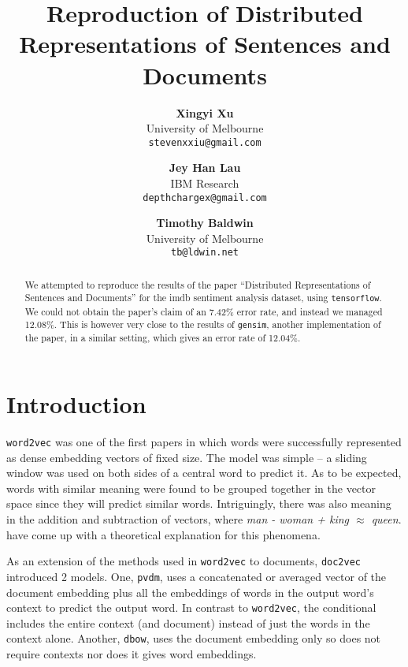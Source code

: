 \documentclass{article}
\begin{document}
\title{Reproduction of Distributed Representations of Sentences and Documents}

\author{
  \textbf{Xingyi Xu} \\ University of Melbourne \\ \texttt{stevenxxiu@gmail.com} \and
  \textbf{Jey Han Lau} \\ IBM Research \\ \texttt{depthchargex@gmail.com} \and
  \textbf{Timothy Baldwin} \\ University of Melbourne \\ \texttt{tb@ldwin.net}
}
\maketitle

\begin{abstract}
We attempted to reproduce the results of the paper ``Distributed Representations of Sentences and Documents'' for the imdb sentiment analysis dataset, using \texttt{tensorflow}. We could not obtain the paper's claim of an 7.42\% error rate, and instead we managed 12.08\%. This is however very close to the results of \texttt{gensim}, another implementation of the paper, in a similar setting, which gives an error rate of 12.04\%.
\end{abstract}

\section{Introduction}
\texttt{word2vec} \citep{mikolov_distributed_2013} was one of the first papers in which words were successfully represented as dense embedding vectors of fixed size. The model was simple -- a sliding window was used on both sides of a central word to predict it. As to be expected, words with similar meaning were found to be grouped together in the vector space since they will predict similar words. Intriguingly, there was also meaning in the addition and subtraction of vectors, where \textit{man - woman + king $\approx$ queen}. \cite{arora_rand-walk:_2015} have come up with a theoretical explanation for this phenomena.

As an extension of the methods used in \texttt{word2vec} to documents, \texttt{doc2vec} \citep{le_distributed_2014} introduced 2 models. One, \texttt{pvdm}, uses a concatenated or averaged vector of the document embedding plus all the embeddings of words in the output word's context to predict the output word. In contrast to \texttt{word2vec}, the conditional includes the entire context (and document) instead of just the words in the context alone. Another, \texttt{dbow}, uses the document embedding only so does not require contexts nor does it gives word embeddings.
\end{document}
